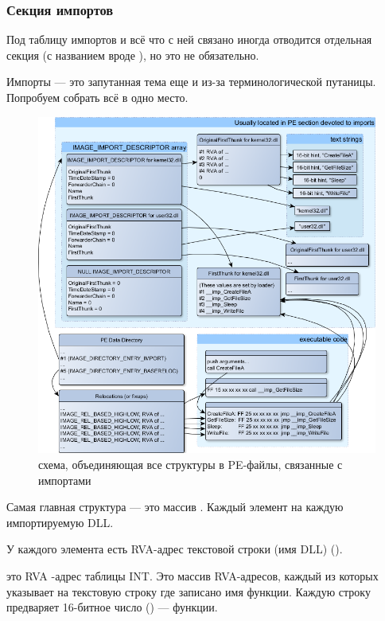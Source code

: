 \subsubsection{Секция импортов}

Под таблицу импортов и всё что с ней связано иногда отводится отдельная секция 
(с названием вроде ),
но это не обязательно.

Импорты --- это запутанная тема еще и из-за терминологической путаницы. Попробуем собрать всё в одно место.

\begin{figure}[H]
\centering
\includegraphics[scale=\FigScale]{OS/PE/unnamed0.png}
\caption{схема, объединяющая все структуры в PE-файлы, связанные с импортами}
\end{figure}

Самая главная структура --- это массив .
Каждый элемент на каждую импортируемую DLL.

У каждого элемента есть \ac{RVA}-адрес текстовой строки (имя DLL) ().

 это \ac{RVA} -адрес таблицы \ac{INT}.
Это массив \ac{RVA}-адресов, каждый из которых указывает на текстовую строку где записано имя функции. 
Каждую строку предваряет 16-битное число () ---  функции.

